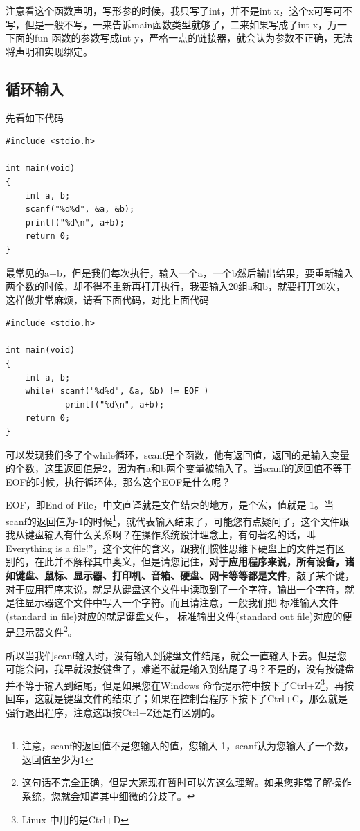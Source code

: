 \documentclass[11pt,twoside,a4paper,titlepage]{article}	%
\newcommand{\kw}[1]{\textcolor[rgb]{0.0,0.0,0.63}{ #1}}
\begin{document}
注意看这个函数声明，写形参的时候，我只写了int，并不是int x，这个x可写可不写，但是一般不写，一来告诉main函数类型就够了，二来如果写成了int x，万一下面的fun 函数的参数写成int y，严格一点的链接器，就会认为参数不正确，无法将声明和实现绑定。

\subsection{循环输入}
先看如下代码

\begin{lstlisting}
#include <stdio.h>

int main(void)
{
	int a, b;
	scanf("%d%d", &a, &b);
	printf("%d\n", a+b);
	return 0;
}
\end{lstlisting}

最常见的a+b，但是我们每次执行，输入一个a，一个b然后输出结果，要重新输入两个数的时候，却不得不重新再打开执行，我要输入20组a和b，就要打开20次，这样做非常麻烦，请看下面代码，对比上面代码

\begin{lstlisting}
#include <stdio.h>

int main(void)
{
	int a, b;
	while( scanf("%d%d", &a, &b) != EOF )
			printf("%d\n", a+b);
	return 0;
}
\end{lstlisting}

可以发现我们多了个while循环，scanf是个函数，他有返回值，返回的是输入变量的个数，这里返回值是2，因为有a和b两个变量被输入了。当scanf的返回值不等于EOF的时候，执行循环体，那么这个EOF是什么呢？

EOF，即End of File，中文直译就是文件结束的地方，是个宏，值就是-1。当scanf的返回值为-1的时候\footnote{注意，scanf的返回值不是您输入的值，您输入-1，scanf认为您输入了一个数，返回值至少为1}，就代表输入结束了，可能您有点疑问了，这个文件跟我从键盘输入有什么关系啊？在操作系统设计理念上，有句著名的话，叫 Everything is a file!”，这个文件的含义，跟我们惯性思维下硬盘上的文件是有区别的，在此并不解释其中奥义，但是请您记住，\textbf{对于应用程序来说，所有设备，诸如键盘、鼠标、显示器、打印机、音箱、硬盘、网卡等等都是文件}，敲了某个键，对于应用程序来说，就是从键盘这个文件中读取到了一个字符，输出一个字符，就是往显示器这个文件中写入一个字符。而且请注意，一般我们把\kw{标准输入文件(standard in file)}对应的就是键盘文件，\kw{标准输出文件(standard out file)}对应的便是显示器文件\footnote{这句话不完全正确，但是大家现在暂时可以先这么理解。如果您非常了解操作系统，您就会知道其中细微的分歧了。}。

所以当我们scanf输入时，没有输入到键盘文件结尾，就会一直输入下去。但是您可能会问，我早就没按键盘了，难道不就是输入到结尾了吗？不是的，没有按键盘并不等于输入到结尾，但是如果您在Windows 命令提示符中按下了Ctrl+Z\footnote{Linux 中用的是Ctrl+D}，再按回车，这就是键盘文件的结束了；如果在控制台程序下按下了Ctrl+C，那么就是强行退出程序，注意这跟按Ctrl+Z还是有区别的。
\end{document}
